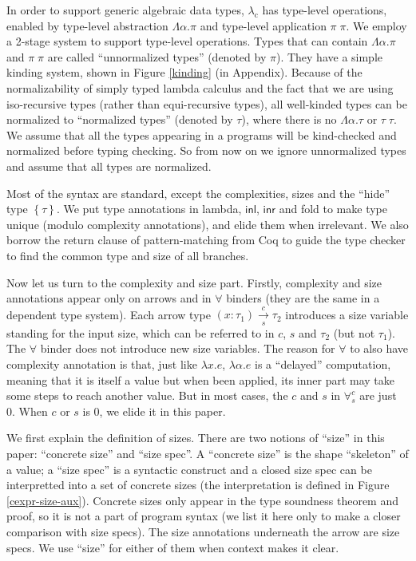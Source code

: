 \documentclass[preprint]{sigplanconf}
\newcommand{\thide}[1]{\left \{ #1 \right \}}
\newcommand{\arrow}[4]{#1\xrightarrow[#3]{#2}#4}
\newcommand{\syminl}{\mathsf{inl}}
\newcommand{\syminr}{\mathsf{inr}}
\newcommand{\intro}[2]{(#1 : #2)}
\newcommand{\logo}{\lambda_\mathrm{c}}
\begin{document}
In order to support generic algebraic data types, $\logo$ has type-level operations, enabled by type-level abstraction $\Lambda\alpha.\pi$ and type-level application $\pi\;\pi$. We employ a 2-stage system to support type-level operations. Types that can contain $\Lambda\alpha.\pi$ and $\pi\;\pi$ are called ``unnormalized types'' (denoted by $\pi$). They have a simple kinding system, shown in Figure \ref{kinding} (in Appendix). Because of the normalizability of simply typed lambda calculus and the fact that we are using iso-recursive types (rather than equi-recursive types), all well-kinded types can be normalized to ``normalized types'' (denoted by $\tau$), where there is no $\Lambda\alpha.\tau$ or $\tau\;\tau$. We assume that all the types appearing in a programs will be kind-checked and normalized before typing checking. So from now on we ignore unnormalized types and assume that all types are normalized.

Most of the syntax are standard, except the complexities, sizes and the ``hide'' type $\thide{\tau}$. We put type annotations in lambda, $\syminl$, $\syminr$ and fold to make type unique (modulo complexity annotations), and elide them when irrelevant. We also borrow the return clause of pattern-matching from Coq to guide the type checker to find the common type and size of all branches. 

Now let us turn to the complexity and size part. Firstly, complexity and size annotations appear only on arrows and in $\forall$ binders (they are the same in a dependent type system). Each arrow type $\arrow{\intro{x}{\tau_1}}{c}{s}{\tau_2}$ introduces a size variable standing for the input size, which can be referred to in $c$, $s$ and $\tau_2$ (but not $\tau_1$). The $\forall$ binder does not introduce new size variables. The reason for $\forall$ to also have complexity annotation is that, just like $\lambda x.e$, $\lambda \alpha.e$ is a ``delayed'' computation, meaning that it is itself a value but when been applied, its inner part may take some steps to reach another value. But in most cases, the $c$ and $s$ in $\forall^c_s$ are just 0. When $c$ or $s$ is 0, we elide it in this paper.

We first explain the definition of sizes. There are two notions of ``size'' in this paper: ``concrete size'' and ``size spec''. A ``concrete size'' is the shape ``skeleton'' of a value; a ``size spec'' is a syntactic construct and a closed size spec can be interpretted into a set of concrete sizes (the interpretation is defined in Figure \ref{cexpr-size-aux}). Concrete sizes only appear in the type soundness theorem and proof, so it is not a part of program syntax (we list it here only to make a closer comparison with size specs). The size annotations underneath the arrow are size specs. We use ``size'' for either of them when context makes it clear.
\end{document}
